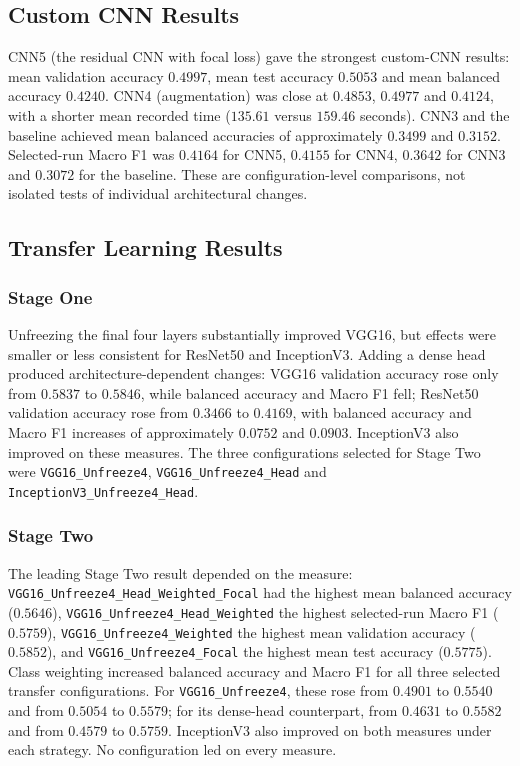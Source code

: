 \documentclass[10pt, a4paper]{article}
\let\oldsubsection\subsection
\renewcommand{\subsection}{%
    \Needspace{4\baselineskip}%
    \oldsubsection
}
\let\oldsubsubsection\subsubsection
\renewcommand{\subsubsection}{%
    \Needspace{4\baselineskip}%
    \oldsubsubsection
}
\begin{document}
		\subsection{Custom CNN Results}
		
			CNN5 (the residual CNN with focal loss) gave the strongest custom-CNN results: mean validation accuracy $0.4997$, mean test accuracy $0.5053$ and mean balanced accuracy $0.4240$. CNN4 (augmentation) was close at $0.4853$, $0.4977$ and $0.4124$, with a shorter mean recorded time ($135.61$ versus $159.46$ seconds). CNN3 and the baseline achieved mean balanced accuracies of approximately $0.3499$ and $0.3152$. Selected-run Macro F1 was $0.4164$ for CNN5, $0.4155$ for CNN4, $0.3642$ for CNN3 and $0.3072$ for the baseline. These are configuration-level comparisons, not isolated tests of individual architectural changes.
		
		\subsection{Transfer Learning Results}
			
			\subsubsection{Stage One}
			
				Unfreezing the final four layers substantially improved VGG16, but effects were smaller or less consistent for ResNet50 and InceptionV3. Adding a dense head produced architecture-dependent changes: VGG16 validation accuracy rose only from $0.5837$ to $0.5846$, while balanced accuracy and Macro F1 fell; ResNet50 validation accuracy rose from $0.3466$ to $0.4169$, with balanced accuracy and Macro F1 increases of approximately $0.0752$ and $0.0903$. InceptionV3 also improved on these measures. The three configurations selected for Stage Two were \texttt{VGG16\_Unfreeze4}, \texttt{VGG16\_Unfreeze4\_Head} and \texttt{InceptionV3\_Unfreeze4\_Head}.
			
			\subsubsection{Stage Two}
				
				The leading Stage Two result depended on the measure: \texttt{VGG16\_Unfreeze4\_Head\_Weighted\_Focal} had the highest mean balanced accuracy ($0.5646$), \texttt{VGG16\_Unfreeze4\_Head\_Weighted} the highest selected-run Macro F1 ($0.5759$), \texttt{VGG16\_Unfreeze4\_Weighted} the highest mean validation accuracy ($0.5852$), and \texttt{VGG16\_Unfreeze4\_Focal} the highest mean test accuracy ($0.5775$). Class weighting increased balanced accuracy and Macro F1 for all three selected transfer configurations. For \texttt{VGG16\_Unfreeze4}, these rose from $0.4901$ to $0.5540$ and from $0.5054$ to $0.5579$; for its dense-head counterpart, from $0.4631$ to $0.5582$ and from $0.4579$ to $0.5759$. InceptionV3 also improved on both measures under each strategy. No configuration led on every measure.
				
\end{document}
